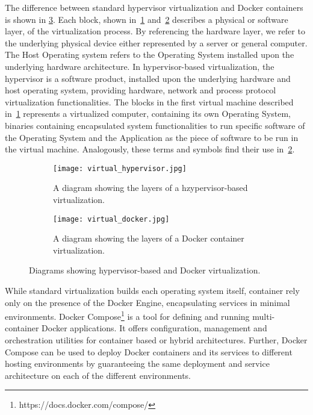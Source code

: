 \documentclass[
a4paper,
twoside,
headsepline,
cleardoublepage=empty,
parskip=half,
draft=false
]{scrbook}
\begin{document}
			The difference between standard hypervisor virtualization and Docker containers is shown in \cref{fig:virtualization}.
			Each block, shown in~\cref{subfig:hypervisor} and~\cref{subfig:docker} describes a physical or software layer, of the virtualization process. 
			By referencing the hardware layer, we refer to the underlying physical device either represented by a server or general computer. 
			The Host Operating system refers to the Operating System installed upon the underlying hardware architecture.
			In hypervisor-based virtualization, the hypervisor is a software product, installed upon the underlying hardware and host operating system, providing hardware, network and process protocol virtualization functionalities.
			The blocks in the first virtual machine described in~\cref{subfig:hypervisor} represents a virtualized computer, containing its own Operating System, binaries containing encapsulated system functionalities to run specific software of the Operating System and the Application as the piece of software to be run in the virtual machine.
			Analogously, these terms and symbols find their use in~\cref{subfig:docker}.
			
			\begin{figure}[htbp]
				\centering
				\begin{subfigure}{0.45\textwidth}
					\centering
					\texttt{[image: virtual\_hypervisor.jpg]}
					\caption{A diagram showing the layers of a hzypervisor-based virtualization.}
					\label{subfig:hypervisor}
				\end{subfigure}
				\hfill
				\begin{subfigure}{0.45\textwidth}
					\centering
					\texttt{[image: virtual\_docker.jpg]}
					\caption{A diagram showing the layers of a Docker container virtualization.}
					\label{subfig:docker}
				\end{subfigure}
				\caption{Diagrams showing hypervisor-based and Docker virtualization.}
				\label{fig:virtualization}
			\end{figure}
			
			While standard virtualization builds each operating system itself, container rely only on the presence of the Docker Engine, encapsulating services in minimal environments.
			Docker Compose\footnote{https://docs.docker.com/compose/} is a tool for defining and running multi-container Docker applications. It offers configuration, management and orchestration utilities for container based or hybrid architectures. Further, Docker Compose can be used to deploy Docker containers and its services to different hosting environments by guaranteeing the same deployment and service architecture on each of the different environments.
\end{document}
